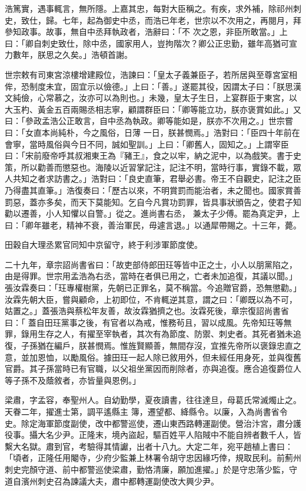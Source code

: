 \begin{pinyinscope}
 浩篤實，遇事輒言，無所隱。上嘉其忠，每對大臣稱之。有疾，求外補，除祁州刺史，致仕，歸。七年，起為御史中丞，而浩已年老，世宗以不次用之，再閱月，拜參知政事。故事，無自中丞拜執政者，浩辭曰：「不
 次之恩，非臣所敢當。」上曰：「卿自刺史致仕，除中丞，國家用人，豈拘階次？卿公正忠勤，雖年高猶可宣力數年，朕思之久矣。」浩頓首謝。



 世宗敕有司東宮涼樓增建殿位，浩諫曰：「皇太子義兼臣子，若所居與至尊宮室相侔，恐制度未宜，固宜示以儉德。」上曰：「善。」遂罷其役，因謂太子曰：「朕思漢文純儉，心常慕之，汝亦可以為則也。」未幾，皇太子生日，上宴群臣于東宮，以大玉杓、黃金五百兩賜丞相志寧，顧謂群臣曰：「卿等能立功，朕亦褒賞如此。」又曰：「參政孟浩公正敢言，自中丞為執政。卿等能如是，朕亦不次用之。」世宗嘗曰：「女直本尚純朴，今之風俗，日薄
 一日，朕甚憫焉。」浩對曰：「臣四十年前在會寧，當時風俗與今日不同，誠如聖訓。」上曰：「卿舊人，固知之。」上謂宰臣曰：「宋前廢帝呼其叔湘東王為『豬王』，食之以牢，納之泥中，以為戲笑。書于史策，所以勸善而懲惡也。海陵以近習掌記注，記注不明，當時行事，實錄不載，眾人共知之者求訪書之。」浩對曰：「良史直筆，君舉必書。帝王不自觀史，記注之臣乃得盡其直筆。」浩復奏曰：「歷古以來，不明賞罰而能治者，未之聞也。國家賞善罰惡，蓋亦多矣，而天下莫能知。乞自今凡賞功罰罪，皆具事狀頒告之，使君子知勸以遷善，小人知懼以自警。」從之。進尚書右丞，
 兼太子少傅。罷為真定尹，上曰：「卿年雖老，精神不衰，善治軍民，毋遽言退。」以通犀帶賜之。十三年，薨。



 田穀自大理丞累官同知中京留守，終于利涉軍節度使。



 二十九年，章宗詔尚書省曰：「故吏部侍郎田玨等皆中正之士，小人以朋黨陷之，由是得罪。世宗用孟浩為右丞，當時在者俱已用之，亡者未加追復，其議以聞。」張汝霖奏曰：「玨專權樹黨，先朝已正罪名，莫不稱當。今追贈官爵，恐無懲勸。」汝霖先朝大臣，嘗與顧命，上初即位，不肯輒逆其意，謂之曰：「卿既以為不可，姑置之。」蓋張浩與蔡松年友善，故汝霖猶擠之也。汝霖死後，章宗復詔尚書省曰：「
 蓋自田玨黨事之後，有官者以為戒，惟務茍且，習以成風。先帝知玨等無罪，錄用生存之人，有擢至宰執者，其次有為節度、防禦、刺史者。其死者猶未追復，子孫猶在編戶，朕甚憫焉。惟旌賢顯善，無間存沒，宜推先帝所以褒錄忠直之意，並加恩恤，以勵風俗。據田玨一起人除已敘用外，但未經任用身死，並與復舊官爵。其子孫當時已有官職，以父祖坐黨因而削除者，亦與追復。應合追復爵位人等子孫不及蔭敘者，亦皆量與恩例。」



 梁肅，字孟容，奉聖州人。自幼勤學，夏夜讀書，往往達旦，母葛氏常滅燭止之。天眷二年，擢進士第，調平遙縣主
 簿，遷望都、絳縣令。以廉，入為尚書省令史。除定海軍節度副使，改中都警巡使，遷山東西路轉運副使。營治汴宮，肅分護役事。攝大名少尹。正隆末，境內盜起，驅百姓平人陷賊中不能自辨者數千人，皆繫大名獄。肅到官，考驗得其情讞，出者十八九。大定二年，宛平趙植上書曰：「頃者，正隆任用閹寺，少府少監兼上林署令胡守忠因緣巧倖，規取民利。前薊州刺史完顏守道、前中都警巡使梁肅，勤恪清廉，願加進擢。」於是守忠落少監，守道自濱州刺史召為諫議大夫，肅中都轉運副使改大興少尹。




\end{pinyinscope}
